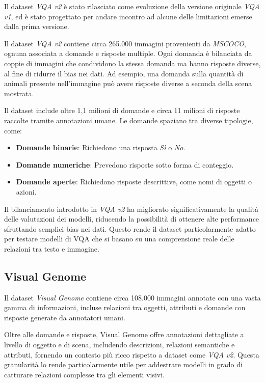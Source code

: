 \documentclass[../main.tex]{subfiles}
\begin{document}
Il dataset \textit{VQA v2} \cite{DBLP:journals/corr/GoyalKSBP16} è stato rilasciato come evoluzione della versione originale \textit{VQA v1}, ed è stato progettato per andare incontro ad alcune delle limitazioni emerse dalla prima versione.

Il dataset \textit{VQA v2} contiene circa 265.000 immagini provenienti da \textit{MSCOCO}, ognuna associata a domande e risposte multiple. Ogni domanda è bilanciata da coppie di immagini che condividono la stessa domanda ma hanno risposte diverse, al fine di ridurre il bias nei dati. Ad esempio, una domanda sulla quantità di animali presente nell'immagine può avere risposte diverse a seconda della scena mostrata.

Il dataset include oltre 1,1 milioni di domande e circa 11 milioni di risposte raccolte tramite annotazioni umane. Le domande spaziano tra diverse tipologie, come:
\begin{itemize}
    \item \textbf{Domande binarie}: Richiedono una risposta \textit{Sì} o \textit{No}.
    \item \textbf{Domande numeriche}: Prevedono risposte sotto forma di conteggio.
    \item \textbf{Domande aperte}: Richiedono risposte descrittive, come nomi di oggetti o azioni.
\end{itemize}

Il bilanciamento introdotto in \textit{VQA v2} ha migliorato significativamente la qualità delle valutazioni dei modelli, riducendo la possibilità di ottenere alte performance sfruttando semplici bias nei dati. 
Questo rende il dataset particolarmente adatto per testare modelli di VQA che si basano su una comprensione reale delle relazioni tra testo e immagine.

\subsection{Visual Genome}

Il dataset \textit{Visual Genome} \cite{DBLP:journals/corr/KrishnaZGJHKCKL16} contiene circa 108.000 immagini annotate con una vasta gamma di informazioni, incluse relazioni tra oggetti, attributi e domande con risposte generate da annotatori umani.

Oltre alle domande e risposte, Visual Genome offre annotazioni dettagliate a livello di oggetto e di scena, includendo descrizioni, relazioni semantiche e attributi, fornendo un contesto più ricco rispetto a dataset come \textit{VQA v2}. Questa granularità lo rende particolarmente utile per addestrare modelli in grado di catturare relazioni complesse tra gli elementi visivi.
\end{document}
